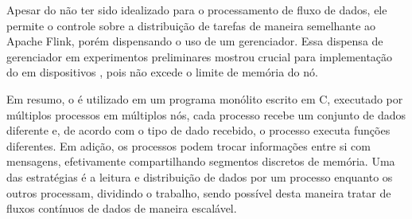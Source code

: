 Apesar do \mpi não ter sido idealizado para o processamento de fluxo de dados, ele
permite o controle sobre a distribuição de tarefas de maneira
semelhante ao Apache Flink, porém dispensando o uso de um
gerenciador. Essa dispensa de gerenciador em experimentos preliminares mostrou
crucial para implementação do \mfog em dispositivos \iot, pois não excede o limite de
memória do nó.

Em resumo, o \mpi é utilizado em um programa monólito escrito em C, executado
por múltiplos processos em múltiplos nós, cada processo recebe um conjunto de
dados diferente e, de acordo com o tipo de dado recebido, o processo executa
funções diferentes.
Em adição, os processos podem trocar informações entre si com mensagens,
efetivamente compartilhando segmentos discretos de memória.
Uma das estratégias é a leitura e distribuição de dados por um processo enquanto
os outros processam, dividindo o trabalho, sendo possível desta maneira tratar
de fluxos contínuos de dados de maneira escalável.

